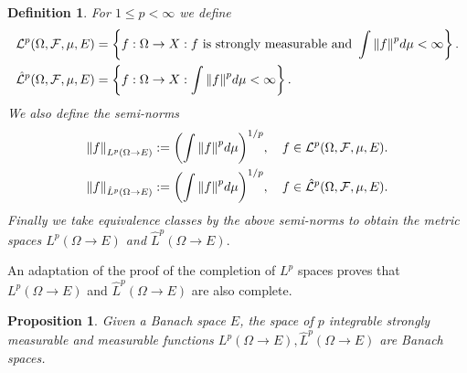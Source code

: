 \documentclass[12pt]{article}
\newtheorem{proposition}{Proposition}
\newtheorem{definition}{Definition}
\begin{document}
\begin{definition}
	For $1\leq p<\infty$ we define
	\begin{align*}
		\mathcal{L}^p(\Omega,\mathcal{F},\mu,E)       & =\left\{f:\Omega\to X: f \text{ is strongly measurable and } \int \norm{f}^p d\mu<\infty\right\}. \\
		\hat{\mathcal{L}}^p(\Omega,\mathcal{F},\mu,E) & =\left\{f:\Omega\to X: \int \norm{f}^p d\mu<\infty\right\}.
	\end{align*}
	We also define the semi-norms
	\begin{align*}
		\norm{f}_{L^p(\Omega\to E)}       & :=\qty(\int \norm{f}^p d\mu)^{1/p},\quad f\in\mathcal{L}^p(\Omega,\mathcal{F},\mu,E).       \\
		\norm{f}_{\hat{L}^p(\Omega\to E)} & :=\qty(\int \norm{f}^p d\mu)^{1/p},\quad f\in\hat{\mathcal{L}}^p(\Omega,\mathcal{F},\mu,E).
	\end{align*}
	Finally we take equivalence classes by the above semi-norms to obtain the metric spaces $L^p(\Omega\to E)$ and $\hat{L}^p(\Omega\to E).$
\end{definition}
An adaptation of the proof of the completion of $L^p$ spaces proves that $L^p(\Omega\to E)$ and $\hat{L}^p(\Omega\to E)$ are also complete.
\begin{proposition}
	Given a Banach space $E$, the space of $p$ integrable strongly measurable and measurable functions $L^p(\Omega\to E),\hat{L}^p(\Omega\to E)$ are Banach spaces.
\end{proposition}
\end{document}
